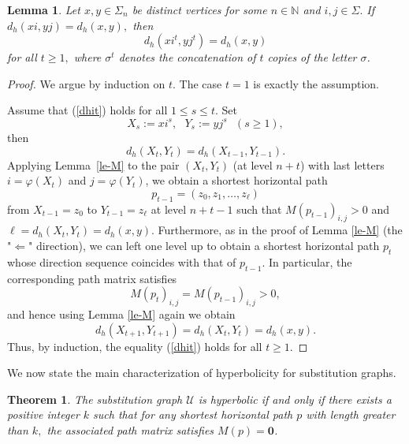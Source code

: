 \documentclass[reqno]{amsart}
\newtheorem{theorem}{Theorem}
\theoremstyle{plain}
\newtheorem{lemma}{Lemma}
\numberwithin{equation}{section}
\begin{document}
\begin{lemma}
\label{le-dhit}Let $x,y\in \Sigma _{n}$ be distinct vertices for some $n\in 
\mathbb{N}$ and $i,j\in \Sigma .$ If $d_{h}(xi,yj)=d_{h}(x,y),$ then 
\begin{equation}
d_{h}(xi^{t},yj^{t})=d_{h}(x,y)  \label{dhit}
\end{equation}
for all $t\geq 1,$ where $\sigma ^{t}$ denotes the concatenation of $t$
copies of the letter $\sigma $.
\end{lemma}

\begin{proof}
We argue by induction on $t$. The case $t=1$ is exactly the assumption.

Assume that (\ref{dhit}) holds for all $1\leq s\leq t$. Set 
\begin{equation*}
X_{s}:=xi^{s},\text{ }Y_{s}:=yj^{s}\text{ }(s\geq 1),
\end{equation*}%
then 
\begin{equation*}
d_{h}(X_{t},Y_{t})=d_{h}(X_{t-1},Y_{t-1}).
\end{equation*}%
Applying Lemma\ \ref{le-M} to the pair $(X_{t},Y_{t})$ (at level $n+t$) with
last letters $i=\varphi (X_{t})$ and $j=\varphi (Y_{t})$, we obtain a
shortest horizontal path 
\begin{equation*}
p_{t-1}=(z_{0},z_{1},\dots ,z_{\ell })
\end{equation*}%
from $X_{t-1}=z_{0}$ to $Y_{t-1}=z_{\ell }$ at level $n+t-1$ such that $%
M(p_{t-1})_{i,j}>0$ and $\ell =d_{h}(X_{t},Y_{t})=d_{h}(x,y)$. Furthermore,
as in the proof of Lemma \ref{le-M} (the "$\Leftarrow $" direction), we can
left one level up to obtain a shortest horizontal path $p_{t}$ whose
direction sequence coincides with that of $p_{t-1}.$ In particular, the
corresponding path matrix satisfies 
\begin{equation*}
M(p_{t})_{i,j}=M(p_{t-1})_{i,j}>0,
\end{equation*}%
and hence using Lemma \ref{le-M} again we obtain 
\begin{equation*}
d_{h}(X_{t+1},Y_{t+1})=d_{h}(X_{t},Y_{t})=d_{h}(x,y).
\end{equation*}%
Thus, by induction, the equality (\ref{dhit}) holds for all $t\geq 1$.
\end{proof}

We now state the main characterization of hyperbolicity for substitution
graphs.

\begin{theorem}
\label{th-equ}The substitution graph $\mathcal{U}$ is hyperbolic if and only
if there exists a positive integer $k$ such that for any shortest horizontal
path $p$ with length greater than $k,$ the associated path matrix satisfies $%
M(p)=\boldsymbol{0}$.
\end{theorem}
\end{document}
